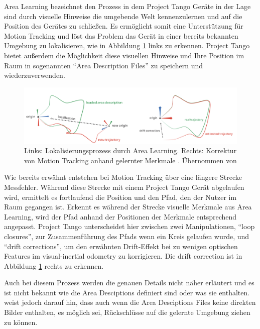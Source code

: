 Area Learning bezeichnet den Prozess in dem Project Tango Geräte in der Lage sind durch visuelle Hinweise die umgebende Welt kennenzulernen und auf die Position des Gerätes zu schließen. 
Es ermöglicht somit eine Unterstützung für Motion Tracking und löst das Problem das Gerät in einer bereits bekannten Umgebung zu lokalisieren, wie in Abbildung \ref{fig:area-learning} links zu erkennen.
Project Tango bietet außerdem die Möglichkeit diese visuellen Hinweise und Ihre Position im Raum in sogenannten \enquote{Area Description Files} zu speichern und wiederzuverwenden. \citep{GoogleDevelopersConcepts:online}

\begin{figure}[h]
  \centering
	\includegraphics[width=1.0\textwidth]{content/images/theory/tango-area-learning.png} 
  \caption{Links: Lokalisierungsprozess durch Area Learning. Rechts: Korrektur von Motion Tracking anhand gelernter Merkmale . Übernommen von \citet{GoogleDevelopers:online}}
  \label{fig:area-learning}
\end{figure}

Wie bereits erwähnt entstehen bei Motion Tracking über eine längere Strecke Messfehler. 
Während diese Strecke mit einem Project Tango Gerät abgelaufen wird, ermittelt es fortlaufend die Position und den Pfad, den der Nutzer im Raum gegangen ist. 
Erkennt es während der Strecke visuelle Merkmale aus Area Learning, wird der Pfad anhand der Positionen der Merkmale entsprechend angepasst. 
Project Tango unterscheidet hier zwischen zwei Manipulationen, \enquote{loop closures}, zur Zusammenführung des Pfads wenn ein Kreis gelaufen wurde, und \enquote{drift corrections}, um den erwähnten Drift-Effekt bei zu wenigen optischen Features im visual-inertial odometry zu korrigieren. 
Die drift correction ist in Abbildung \ref{fig:area-learning} rechts zu erkennen. \citep{GoogleDevelopersConcepts:online} 

Auch bei diesem Prozess werden die genauen Details nicht näher erläutert und es ist nicht bekannt wie die Area Desciptions definiert sind oder was sie enthalten. \citet{GoogleDevelopersConcepts:online} weist jedoch darauf hin, dass auch wenn die Area Desciptions Files keine direkten Bilder enthalten, es möglich sei, Rückschlüsse auf die gelernte Umgebung ziehen zu können. 

